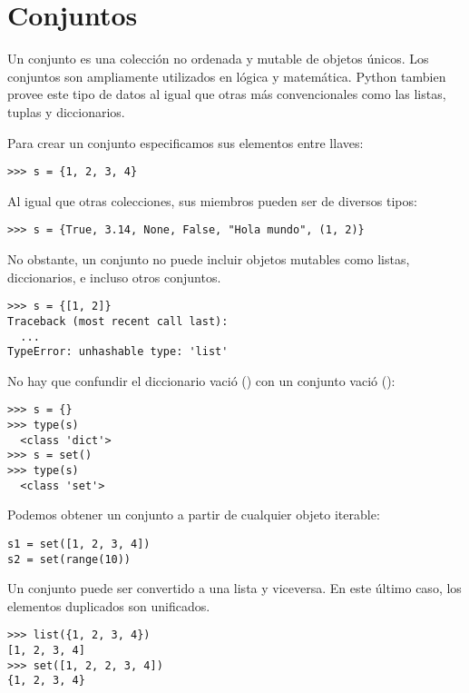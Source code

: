 \section{Conjuntos}\label{conjuntos}

Un conjunto es una colección no ordenada y mutable de objetos únicos. 
Los conjuntos son ampliamente utilizados en lógica y matemática.
Python tambien provee este tipo de datos al igual que otras más convencionales como las listas, tuplas y diccionarios.

Para crear un conjunto especificamos sus elementos entre llaves:

\begin{Verbatim}[frame=single]
>>> s = {1, 2, 3, 4}
\end{Verbatim}

Al igual que otras colecciones, sus miembros pueden ser de diversos tipos:

\begin{Verbatim}[frame=single]
>>> s = {True, 3.14, None, False, "Hola mundo", (1, 2)}
\end{Verbatim}

No obstante, un conjunto no puede incluir objetos mutables como listas, diccionarios, e incluso otros conjuntos.

\begin{Verbatim}[frame=single]
>>> s = {[1, 2]}
Traceback (most recent call last):
  ...
TypeError: unhashable type: 'list'
\end{Verbatim}

No hay que confundir el diccionario vació (\pythoninline{ \{\} }) con un  conjunto vació ():

\begin{Verbatim}[frame=single]
>>> s = {}
>>> type(s)
  <class 'dict'>
>>> s = set()
>>> type(s)
  <class 'set'>
\end{Verbatim}

Podemos obtener un conjunto a partir de cualquier objeto iterable:

\begin{Verbatim}[frame=single]
s1 = set([1, 2, 3, 4])
s2 = set(range(10))
\end{Verbatim}

Un conjunto puede ser convertido a una lista y viceversa. En este último caso, los elementos duplicados son unificados.

\begin{Verbatim}[frame=single]
>>> list({1, 2, 3, 4})
[1, 2, 3, 4]
>>> set([1, 2, 2, 3, 4])
{1, 2, 3, 4}
\end{Verbatim}



